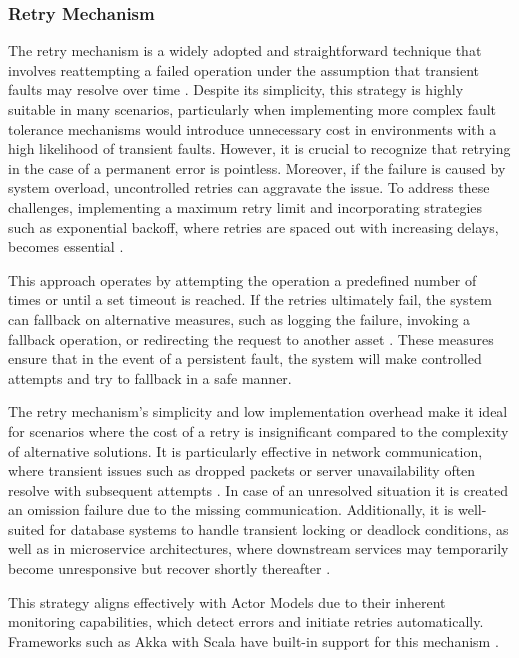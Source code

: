 \subsubsection{Retry Mechanism}

The retry mechanism is a widely adopted and straightforward technique that involves reattempting a failed operation under the assumption that transient faults may resolve over time \cite{Ledmi2018}. Despite its simplicity, this strategy is highly suitable in many scenarios, particularly when implementing more complex fault tolerance mechanisms would introduce unnecessary cost in environments with a high likelihood of transient faults. However, it is crucial to recognize that retrying in the case of a permanent error is pointless. Moreover, if the failure is caused by system overload, uncontrolled retries can aggravate the issue. To address these challenges, implementing a maximum retry limit and incorporating strategies such as exponential backoff, where retries are spaced out with increasing delays, becomes essential \cite{Kleppmann2017,Vitillo2021}.

This approach operates by attempting the operation a predefined number of times or until a set timeout is reached. If the retries ultimately fail, the system can fallback on alternative measures, such as logging the failure, invoking a fallback operation, or redirecting the request to another asset \cite{Isukapalli2024}. These measures ensure that in the event of a persistent fault, the system will make controlled attempts and try to fallback in a safe manner.

The retry mechanism’s simplicity and low implementation overhead make it ideal for scenarios where the cost of a retry is insignificant compared to the complexity of alternative solutions. It is particularly effective in network communication, where transient issues such as dropped packets or server unavailability often resolve with subsequent attempts \cite{Isukapalli2024}. In case of an unresolved situation it is created an omission failure due to the missing communication. Additionally, it is well-suited for database systems to handle transient locking or deadlock conditions, as well as in microservice architectures, where downstream services may temporarily become unresponsive but recover shortly thereafter \cite{Kleppmann2017}.

This strategy aligns effectively with Actor Models due to their inherent monitoring capabilities, which detect errors and initiate retries automatically. Frameworks such as Akka with Scala have built-in support for this mechanism \cite{Isukapalli2024}.


